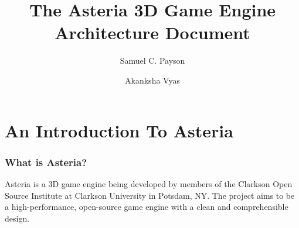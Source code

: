 \documentclass[10pt]{article}
\title{\textbf{The Asteria 3D Game Engine} \\ \textbf{\small Architecture Document } }
\author{Samuel C. Payson \and Akanksha Vyas}
\begin{document}
\maketitle

\begin{center}
   \begin{tikzpicture}
      
   \end{tikzpicture}
\end{center}

\thispagestyle{empty}
\pagebreak
{}
\setcounter{page}{1}
\tableofcontents

\pagebreak
{}
\setcounter{page}{1}

\part{An Introduction To Asteria}

\section{What is Asteria?}
Asteria is a 3D game engine being developed by members of the Clarkson Open
Source Institute at Clarkson University in Potsdam, NY. The project aims to be
a high-performance, open-source game engine with a clean and comprehensible
design. 
\end{document}
